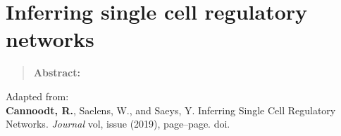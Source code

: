 \newpage{\thispagestyle{empty}\cleardoublepage}
\chapter{Inferring single cell regulatory networks} 
\label{chap:brood}

\begin{quote}
	\textbf{Abstract:} \blindtext
\end{quote}

\vfill

Adapted from:\\
\textbf{Cannoodt, R.}, Saelens, W., and Saeys, Y. Inferring Single Cell Regulatory Networks. \textit{Journal} vol, issue (2019), page--page. doi.
\newpage

\blindtext